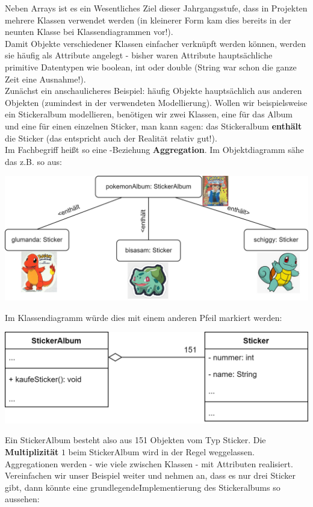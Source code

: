 \documentclass[fontsize=12pt]{article}
\begin{document}
\thispagestyle{firstpage}
\setlength{\headsep}{12pt}
Neben Arrays ist es ein Wesentliches Ziel dieser Jahrgangsstufe, dass in Projekten mehrere Klassen verwendet werden (in kleinerer Form kam dies bereits in der neunten Klasse bei Klassendiagrammen vor!). \\
Damit Objekte verschiedener Klassen einfacher verknüpft werden können, werden sie häufig als Attribute angelegt - bisher waren Attribute hauptsächliche primitive Datentypen wie boolean, int oder double (String war schon die ganze Zeit eine Ausnahme!). \\
Zunächst ein anschaulicheres Beispiel: häufig  Objekte hauptsächlich aus anderen Objekten (zumindest in der verwendeten Modellierung). Wollen wir beispielsweise ein Stickeralbum modellieren, benötigen wir zwei Klassen, eine für das Album und eine für einen einzelnen Sticker, man kann sagen: das Stickeralbum \textbf{enthält} die Sticker (das entspricht auch der Realität relativ gut!). \\
Im Fachbegriff heißt so eine -Beziehung \textbf{Aggregation}. Im Objektdiagramm sähe das z.B. so aus: 
\begin{center}
    \includegraphics[scale=0.35]{media/obj_diagramm_album.png}
\end{center}
Im Klassendiagramm würde dies mit einem anderen Pfeil markiert werden:
\begin{center}
    \includegraphics[scale=0.20]{media/class_diagram_album.png}
\end{center}
Ein StickerAlbum besteht also aus 151 Objekten vom Typ Sticker. Die \textbf{Multiplizität} $1$ beim StickerAlbum wird in der Regel weggelassen. Aggregationen werden - wie viele  zwischen Klassen - mit Attributen realisiert. Vereinfachen wir unser Beispiel weiter und nehmen an, dass es nur drei Sticker gibt, dann könnte eine grundlegendeImplementierung des Stickeralbums so aussehen: 
\end{document}
